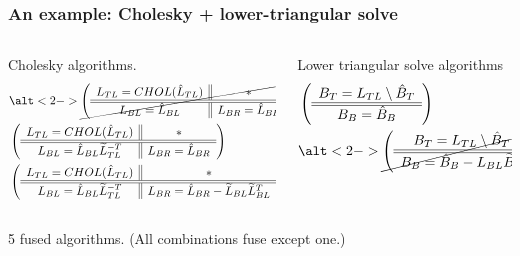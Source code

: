 \documentclass{beamer}
\begin{document}
\begin{frame}
  \frametitle{An example: Cholesky + lower-triangular solve}
  \begin{columns}
    \begin{column}{0.5\textwidth}
      Cholesky algorithms.
      \begin{align*}
        &\alt<2->{\cancel{\FlaTwoByTwo{L_{TL} = CHOL(\hat{L}_{TL})}{*}
          {L_{BL} = \hat{L}_{BL}}{L_{BR} = \hat{L}_{BR}}}}
          {\FlaTwoByTwo{L_{TL} = CHOL(\hat{L}_{TL})}{*}
          {L_{BL} = \hat{L}_{BL}}{L_{BR} = \hat{L}_{BR}}}\\
        &\FlaTwoByTwo{L_{TL} = CHOL(\hat{L}_{TL})}{*}
          {L_{BL} = \hat{L}_{BL}\widetilde{L}_{TL}^{-T}}{L_{BR} = \hat{L}_{BR}}\\
        &\FlaTwoByTwo{L_{TL} = CHOL(\hat{L}_{TL})}{*}
          {L_{BL} = \hat{L}_{BL}\widetilde{L}_{TL}^{-T}}{L_{BR} = \hat{L}_{BR} - \widetilde{L}_{BL}\widetilde{L}_{BL}^T}\\
      \end{align*}
    \end{column}
    \begin{column}{0.5\textwidth}
      Lower triangular solve algorithms
      \begin{align*}
        &\FlaTwoByOne{B_T = L_{TL} \setminus \hat{B}_T}{B_B = \hat{B}_B}\\
        &\alt<2->{\cancel{\FlaTwoByOne{B_T = L_{TL} \setminus \hat{B}_T}{B_B = \hat{B}_B - L_{BL}\widetilde{B}_T}}}
        {\FlaTwoByOne{B_T = L_{TL} \setminus \hat{B}_T}{B_B = \hat{B}_B - L_{BL}\widetilde{B}_T}}\\
      \end{align*}
    \end{column}
  \end{columns}

  5 fused algorithms. (All combinations fuse except one.)
\end{frame}
\end{document}
